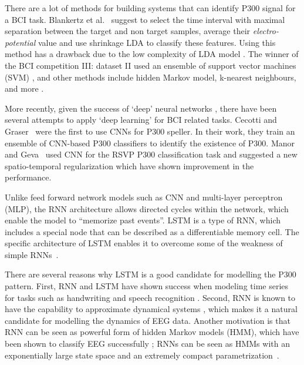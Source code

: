 \documentclass[
11pt, %
english, %
singlespacing, %
headsepline, %
]{MastersDoctoralThesis} %
\begin{document}
There are a lot of methods for building systems that can identify P300 signal for a BCI task. Blankertz et al.~\cite{P300_Tutorial} suggest to select the time interval with maximal separation between the target and non target samples, average their \textit{electro-potential} value and use shrinkage LDA to classify these features. Using this method has a drawback due to the low complexity of LDA model \cite{cincotti2003comparison}. The winner of the BCI competition III: dataset II used an ensemble of support vector machines (SVM) \cite{P300SVMWinner}, and other methods include hidden Markov model, k-nearest neighbours, and more  \cite{cincotti2003comparison}.

More recently, given the success of `deep' neural networks \cite{krizhevsky2012imagenet}, there have been several attempts to apply `deep learning' for BCI related tasks. Cecotti and Graser~\cite{P300_CNN} were the first to use CNNs  for P300 speller. In their work, they train an ensemble of CNN-based P300 classifiers to identify the existence of P300. Manor and Geva~\cite{RSVP_P300_geva} used CNN for the RSVP P300 classification task and suggested a new spatio-temporal regularization which have shown improvement in the performance.


Unlike feed forward network models such as CNN and multi-layer perceptron (MLP),  the RNN architecture allows directed cycles within the network, which enable the model to ``memorize past events''. LSTM \cite{LSTM_origin} is a type of RNN, which includes a special node that can be described as a differentiable memory cell. The specific architecture of LSTM enables it to overcome some of the weakness of simple RNNs~\cite{bengio1994learning}.

There are several reasons why LSTM is a good candidate for modelling the P300 pattern. First, RNN and LSTM have shown success when modeling time series for tasks such as handwriting and speech recognition \cite{graves2013speech,  graves2008unconstrained, yue2015beyond}. Second, RNN is known to have the capability to approximate dynamical systems \cite{li2005approximation}, which makes it a natural candidate for modelling the dynamics of EEG data. Another motivation is that RNN can be seen as powerful form of hidden Markov models (HMM), which have been shown to classify EEG successfully \cite{solhjoo2005classification,obermaier2001hidden,cincotti2003comparison}; RNNs can be seen as HMMs with an exponentially large state space and an extremely compact parametrization~\cite{sutskever2009recurrent}.
\end{document}
